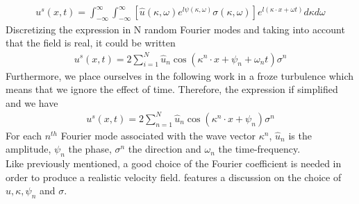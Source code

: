 \documentclass[a4paper,12pt]{article}
\theoremstyle{definition}
\begin{document}
\begin{align}
    u^s(x,t)=\int_{-\infty}^\infty\int_{-\infty}^{\infty}\left[ \hat{u}(\kappa,\omega)e^{l\psi(\kappa,\omega)}\sigma(\kappa,\omega) \right] e^{l(\kappa\cdot x + \omega t)} d\kappa d\omega
\end{align}
Discretizing the expression in N random Fourier modes and taking into account that the field is real, it could be written 
\begin{align}
    u^s(x,t)= 2 \sum_{i=1}^N \hat{u}_n \cos(\kappa^n\cdot x + \psi_n + \omega_n t)\sigma^n
\end{align}
Furthermore, we place ourselves in the following work in a froze turbulence which means that we ignore the effect of time. Therefore, the expression if simplified and we have
\begin{align}
    u^s(x,t)= 2 \sum_{n=1}^N \hat{u}_n \cos(\kappa^n\cdot x + \psi_n)\sigma^n
\end{align}
For each $n^{th}$ Fourier mode associated with the wave vector $\kappa^n$, $\hat{u}_n$ is the amplitude, $\psi_n$ the phase, $\sigma^n$ the direction and $\omega_n$ the time-frequency. \\
Like previously mentioned, a good choice of the Fourier coefficient is needed in order to produce a realistic velocity field. \cite{Janin2021} features a discussion on the choice of $\hat{u}, \kappa, \psi_n$ and $\sigma$.
\end{document}
